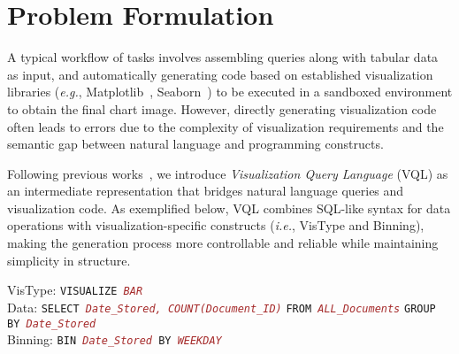 
\section{Problem Formulation}
\label{problem_definition}
A typical workflow of \nlvis tasks involves assembling queries along with tabular data as input, and automatically generating code based on established visualization libraries (\emph{e.g.}, Matplotlib~\cite{barrett2005matplotlib}, Seaborn~\cite{seaborn}) to be executed in a sandboxed environment to obtain the final chart image. 
However, directly generating visualization code often leads to errors due to the complexity of visualization requirements and the semantic gap between natural language and programming constructs.

Following previous works~\cite{nvBench_SIGMOD21,automated}, we introduce \textit{Visualization Query Language} (VQL) as an intermediate representation that bridges natural language queries and visualization code. 
As exemplified below, VQL combines SQL-like syntax for data operations with visualization-specific constructs (\emph{i.e.}, VisType and Binning), making the generation process more controllable and reliable while maintaining simplicity in structure.
\begin{tcolorbox}[sharp corners, colframe=black, colback=white, boxrule=0.5mm, left=1mm, right=1mm, top=1mm, bottom=1mm]
\footnotesize
VisType: \texttt{VISUALIZE \textit{\textcolor{brown}{BAR}}}\\
Data:    \texttt{SELECT \textit{\textcolor{brown}{Date\_Stored, COUNT(Document\_ID)}}} 
\texttt{FROM \textit{\textcolor{brown}{ALL\_Documents}}} \texttt{GROUP BY \textit{\textcolor{brown}{Date\_Stored}}}\\
Binning: \texttt{BIN \textit{\textcolor{brown}{Date\_Stored}} BY \textit{\textcolor{brown}{WEEKDAY}}}
\end{tcolorbox}


